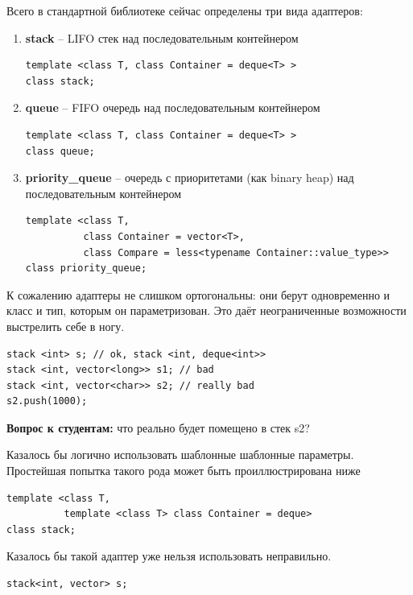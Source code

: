 \documentclass[a4paper,12pt,oneside]{book}
\newif\ifanswers
\begin{document}
Всего в стандартной библиотеке сейчас определены три вида адаптеров:

\begin{enumerate}
\item \textbf{stack} – LIFO стек над последовательным контейнером
\begin{lstlisting}
template <class T, class Container = deque<T> > 
class stack;
\end{lstlisting}
\item \textbf{queue} – FIFO очередь над последовательным контейнером
\begin{lstlisting}
template <class T, class Container = deque<T> > 
class queue;
\end{lstlisting}
\item \textbf{priority\_queue} – очередь с приоритетами (как binary heap) над последовательным контейнером
\begin{lstlisting}
template <class T, 
          class Container = vector<T>,
          class Compare = less<typename Container::value_type>>
class priority_queue;
\end{lstlisting}
\end{enumerate}

К сожалению адаптеры не слишком ортогональны: они берут одновременно и класс и тип, которым он параметризован. Это даёт неограниченные возможности выстрелить себе в ногу.

\begin{lstlisting}
stack <int> s; // ok, stack <int, deque<int>>
stack <int, vector<long>> s1; // bad
stack <int, vector<char>> s2; // really bad
s2.push(1000);
\end{lstlisting}

\textbf{Вопрос к студентам:} что реально будет помещено в стек s2?

\ifanswers
Правильный ответ: 256 - (1024 - 1000) это 232.
\fi

Казалось бы логично использовать шаблонные шаблонные параметры. Простейшая попытка такого рода может быть проиллюстрирована ниже

\begin{lstlisting}
template <class T, 
          template <class T> class Container = deque> 
class stack;
\end{lstlisting}

Казалось бы такой адаптер уже нельзя использовать неправильно.

\begin{lstlisting}
stack<int, vector> s;
\end{lstlisting}
\end{document}
